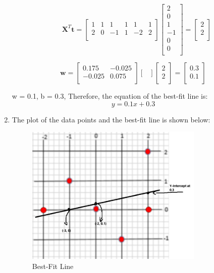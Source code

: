 \documentclass[a4paper,12pt]{article}
\begin{document}
\begin{enumerate}[label=\alph*)]
    \[
    \quad \mathbf{X}^T \mathbf{t} = \begin{bmatrix}
        1 & 1 & 1 & 1 & 1 & 1 \\
        2 & 0 & -1 & 1 & -2 & 2 \\
    \end{bmatrix} \begin{bmatrix}
        2 \\
        0 \\
        1 \\
        -1 \\
        0 \\
        0 \\
    \end{bmatrix} = \begin{bmatrix}
    2 \\
    2 \\
    \end{bmatrix}
    \]
    
    \[
    \mathbf{w} = \begin{bmatrix}
    0.175 & -0.025 \\
    -0.025 & 0.075 \\
    \end{bmatrix} \begin{bmatrix}
    \end{bmatrix}
     \begin{bmatrix}
    2 \\
    2 \\
    \end{bmatrix} = \begin{bmatrix}
    0.3 \\
    0.1 \\
    \end{bmatrix}
    \]

    w = 0.1, b = 0.3, Therefore, the equation of the best-fit line is:
    \[
    y = 0.1x + 0.3
    \]

    \item The plot of the data points and the best-fit line is shown below:
    \begin{figure}[H]
        \centering
        \includegraphics[width=0.8\textwidth]{bestFit.png}
        \caption{Best-Fit Line}
        \label{fig:best_fit_line}
    \end{figure}


\end{enumerate}
\end{document}
